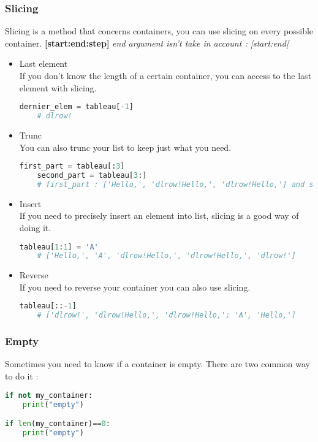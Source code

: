 \documentclass[a4paper, 12pt, titlepage]{scrartcl} %
\begin{document}
\subsubsection{Slicing}
Slicing is a method that concerns containers, you can use slicing on every possible container. \textbf{[start:end:step]} \textit{end argument isn't take in account : [start:end[}
\begin{itemize}
    \item Last element \\
    If you don't know the length of a certain container, you can access to the last element with slicing.
    \begin{lstlisting}[language=Python]
    dernier_elem = tableau[-1]
    # dlrow!
    \end{lstlisting}
    
    \item Trunc \\
    You can also trunc your list to keep just what you need.
    \begin{lstlisting}[language=Python]
    first_part = tableau[:3]
    second_part = tableau[3:]
    # first_part : ['Hello,', 'dlrow!Hello,', 'dlrow!Hello,'] and second_part : ['dlrow!']
    \end{lstlisting}
    
    \item Insert \\
    If you need to precisely insert an element into list, slicing is a good way of doing it.
    \begin{lstlisting}[language=Python]
    tableau[1:1] = 'A'
    # ['Hello,', 'A', 'dlrow!Hello,', 'dlrow!Hello,', 'dlrow!']
    \end{lstlisting}
    
    \item Reverse \\
    If you need to reverse your container you can also use slicing.
    \begin{lstlisting}[language=Python]
    tableau[::-1]
    # ['dlrow!', 'dlrow!Hello,', 'dlrow!Hello,'; 'A', 'Hello,']
    \end{lstlisting}
\end{itemize}

\subsubsection{Empty}
Sometimes you need to know if a container is empty. There are two common way to do it :
\begin{lstlisting}[language=Python]
if not my_container:
    print("empty")

if len(my_container)==0:
    print("empty")
\end{lstlisting}
\end{document}

